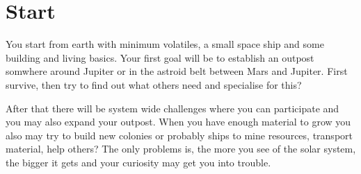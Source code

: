 \section{Start}

You start from earth with minimum volatiles, a small space ship and some building and living basics. 
Your first goal will be to establish an outpost somwhere around Jupiter or in the astroid belt between Mars and
Jupiter. First survive, then try to find out what others need and specialise for this? 

After that there will be system wide challenges where you can participate and you may also expand
your outpost. When you have enough material to grow you also may try to build new colonies or
probably ships to mine resources, transport material, help others? The only problems is,
the more you see of the solar system, the bigger it gets and your curiosity may get you into
trouble.

